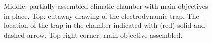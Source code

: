 \documentclass[12pt,dvips]{elsarticle}
\begin{document}
\begin{figure}[h!t!b!]
\begin{center}
\end{center}
\caption{Middle: partially assembled climatic chamber with main objectives in place. Top: cutaway drawing of the
electrodynamic trap. The location of the trap in the chamber indicated with (red) solid-and-dashed arrow. Top-right
corner: main objective assembled.} \label{setup}
\end{figure}
\end{document}
